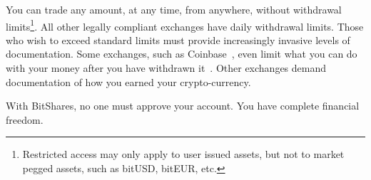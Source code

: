 You can trade any amount, at any time, from anywhere, without withdrawal
limits\footnote{Restricted access may only apply to user issued assets, but not
to market pegged assets, such as bitUSD, bitEUR, etc.}. All other legally
compliant exchanges have daily withdrawal limits. Those who wish to exceed
standard limits must provide increasingly invasive levels of documentation.
Some exchanges, such as Coinbase~\cite{coinbase}, even limit what you can do
with your money after you have withdrawn it~\cite{ct:compliance}. Other
exchanges demand documentation of how you earned your crypto-currency.

With BitShares, no one must approve your account. You have complete financial
freedom.
